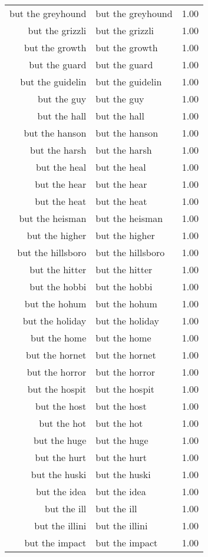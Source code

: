\begin{table}[ht]
\begin{tabular}{rlr}
  but the greyhound & but the greyhound & 1.00 \\ 
  but the grizzli & but the grizzli & 1.00 \\ 
  but the growth & but the growth & 1.00 \\ 
  but the guard & but the guard & 1.00 \\ 
  but the guidelin & but the guidelin & 1.00 \\ 
  but the guy & but the guy & 1.00 \\ 
  but the hall & but the hall & 1.00 \\ 
  but the hanson & but the hanson & 1.00 \\ 
  but the harsh & but the harsh & 1.00 \\ 
  but the heal & but the heal & 1.00 \\ 
  but the hear & but the hear & 1.00 \\ 
  but the heat & but the heat & 1.00 \\ 
  but the heisman & but the heisman & 1.00 \\ 
  but the higher & but the higher & 1.00 \\ 
  but the hillsboro & but the hillsboro & 1.00 \\ 
  but the hitter & but the hitter & 1.00 \\ 
  but the hobbi & but the hobbi & 1.00 \\ 
  but the hohum & but the hohum & 1.00 \\ 
  but the holiday & but the holiday & 1.00 \\ 
  but the home & but the home & 1.00 \\ 
  but the hornet & but the hornet & 1.00 \\ 
  but the horror & but the horror & 1.00 \\ 
  but the hospit & but the hospit & 1.00 \\ 
  but the host & but the host & 1.00 \\ 
  but the hot & but the hot & 1.00 \\ 
  but the huge & but the huge & 1.00 \\ 
  but the hurt & but the hurt & 1.00 \\ 
  but the huski & but the huski & 1.00 \\ 
  but the idea & but the idea & 1.00 \\ 
  but the ill & but the ill & 1.00 \\ 
  but the illini & but the illini & 1.00 \\ 
  but the impact & but the impact & 1.00 \\ 

\end{tabular}
\end{table}
